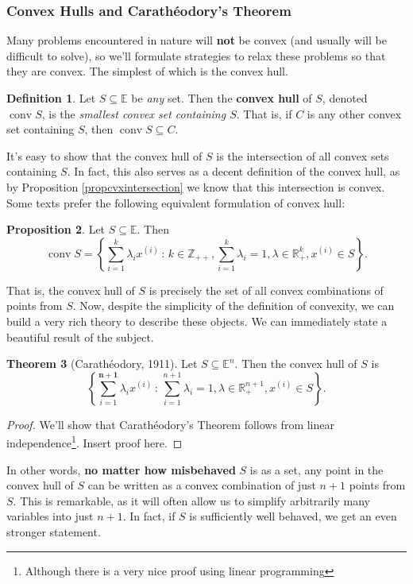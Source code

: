 \documentclass[11pt]{article}
\numberwithin{equation}{section}
\theoremstyle{definition}
\newtheorem{theorem}{Theorem}[section]
\newtheorem{proposition}[theorem]{Proposition}
\newtheorem{definition}[theorem]{Definition}%
\newcommand{\bE}{\mathbb{E}}
\newcommand{\bR}{\mathbb{R}}
\newcommand{\bZ}{\mathbb{Z}}
\newcommand{\set}[2]{\left\{#1\,:\,#2\right\}}
\newcommand{\conv}{\operatorname{conv}}
\begin{document}
\subsubsection{Convex Hulls and Carath\'eodory's Theorem}
Many problems encountered in nature will \textbf{not} be convex (and usually will be difficult to solve), so we'll formulate strategies to relax these problems so that they are convex. The simplest of which is the convex hull.
\begin{definition}
    Let $S\subseteq\bE$ be \textit{any} set. Then the \textbf{convex hull} of $S$, denoted $\conv S$, is the \textit{smallest convex set containing $S$}. That is, if $C$ is any other convex set containing $S$, then $\conv S\subseteq C$.
\end{definition}
It's easy to show that the convex hull of $S$ is the intersection of all convex sets containing $S$. In fact, this also serves as a decent definition of the convex hull, as by Proposition \ref{propcvxintersection} we know that this intersection is convex. Some texts prefer the following equivalent formulation of convex hull:
\begin{proposition}
    Let $S\subseteq\bE$. Then
    \begin{equation}
        \conv S=\set{\sum_{i=1}^k\lambda_ix^{(i)}}{k\in \bZ_{++}, \sum_{i=1}^k\lambda_i=1, \lambda\in \bR_+^k, x^{(i)}\in S}.
    \end{equation}
\end{proposition}
That is, the convex hull of $S$ is precisely the set of all convex combinations of points from $S$. Now, despite the simplicity of the definition of convexity, we can build a very rich theory to describe these objects.
We can immediately state a beautiful result of the subject.
\begin{theorem}[Carath\'eodory, 1911]
    \label{thmcaratheodory}%
    Let $S\subseteq\bE^n$. Then the convex hull of $S$ is
    \begin{equation}
        \label{thmcaratheodoryeq}
        \set{\sum_{i=1}^{\mathbf{n+1}}\lambda_ix^{(i)}}{ \sum_{i=1}^{n+1}\lambda_i=1, \lambda\in \bR_+^{n+1}, x^{(i)}\in S}.
    \end{equation}
\end{theorem}
\begin{proof}
    We'll show that Carath\'eodory's Theorem follows from linear independence\footnote{Although there is a very nice proof using linear programming}. Insert proof here.
\end{proof}
In other words, \textbf{no matter how misbehaved} $S$ is as a set, any point in the convex hull of $S$ can be written as a convex combination of just $n+1$ points from $S$. This is remarkable, as it will often allow us to simplify arbitrarily many variables into just $n+1$. In fact, if $S$ is sufficiently well behaved, we get an even stronger statement.
\end{document}

